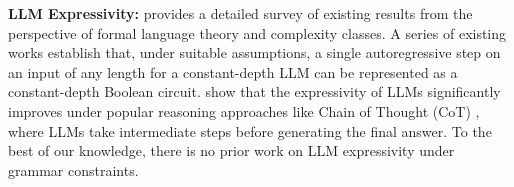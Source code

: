 \textbf{LLM Expressivity:} \cite{survey} provides a detailed survey of existing results from the perspective of formal language theory and complexity classes. A series of existing works \cite{circuit1, cicuit2, circuit3, tc0} establish that, under suitable assumptions, a single autoregressive step on an input of any length for a constant-depth LLM can be represented as a constant-depth Boolean circuit. \cite{expressivity1, expressivity2} show that the expressivity of LLMs significantly improves under popular reasoning approaches like Chain of Thought (CoT) \cite{cotGoogle}, where LLMs take intermediate steps before generating the final answer. To the best of our knowledge, there is no prior work on LLM expressivity under grammar constraints.